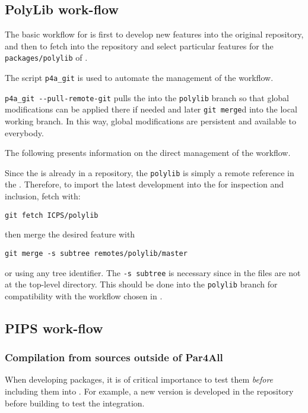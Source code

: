 \documentclass[a4paper]{article}
\begin{document}
\subsection{PolyLib work-flow}
\label{sec:polylib-workflow}

The basic workflow for \Apolylib is first to develop new features into the
original \Apolylib{} \Agit repository, and then to fetch into the
\Apfa{} \Agit repository and select particular features for the
\texttt{packages/polylib} of \Apfa.

The script \verb|p4a_git| is used to automate the management of the
workflow.

\verb|p4a_git --pull-remote-git| pulls the \Apolylib into the
\texttt{polylib} branch so that global modifications can be applied there
if needed and later \texttt{git merge}d into the local working branch. In
this way, global modifications are persistent and available to everybody.

The following presents information on the direct management of the
\Apolylib workflow.

Since the \Apolylib is already in a \Agit repository, the
\texttt{polylib} is simply a remote reference in the \Apfa{} \Agit.
Therefore, to import the latest \Apolylib development into the \Apfa{}
\Agit for
inspection and inclusion, fetch \Apolylib with:
\begin{verbatim}
git fetch ICPS/polylib
\end{verbatim}

then merge the desired feature with
\begin{verbatim}
git merge -s subtree remotes/polylib/master
\end{verbatim}
or using any tree identifier. The \texttt{-s subtree} is necessary since in
\Apfa the \Apolylib files are not at the top-level directory. This should
be done into the \texttt{polylib} branch for compatibility with
the workflow chosen in \Apfa.


\subsection{PIPS work-flow}
\label{sec:pips-workflow}

\subsubsection{Compilation from sources outside of Par4All}
\label{sec:comp-from-sourc}

When developing \Apfa packages, it is of critical importance to test them
\emph{before} including them into \Apfa.
For example, a new \Apips version is developed in the
\Acri{} \Asvn repository before building \Apfa to test the integration.
\end{document}
